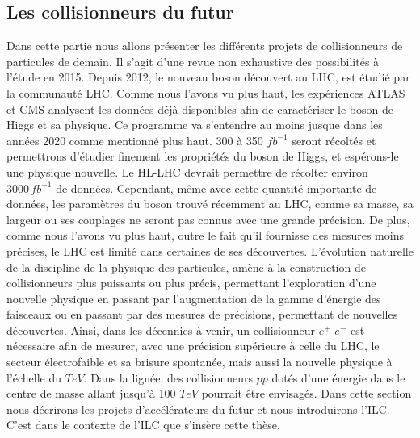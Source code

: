   
  \FloatBarrier
  
  \subsection{Les collisionneurs du futur}
  
  Dans cette partie nous allons pr\'esenter les diff\'erents projets de collisionneurs de particules de demain. Il s'agit d'une revue non exhaustive des possibilit\'es \`a l'\'etude en 2015. Depuis 2012, le nouveau boson d\'ecouvert au LHC, est \'etudi\'e par la communaut\'e LHC. Comme nous l'avons vu plus haut, les exp\'eriences ATLAS et CMS analysent les donn\'ees d\'ej\`a disponibles afin de caract\'eriser le boson de Higgs et sa physique. Ce programme va s'entendre au moins jusque dans les ann\'ees 2020 comme mentionn\'e plus haut. 300 \`a 350 $fb^{-1}$ seront r\'ecolt\'es et permettrons d'\'etudier finement les propri\'et\'es du boson de Higgs, et espérons-le une physique nouvelle. Le HL-LHC devrait permettre de r\'ecolter environ $3000 \, fb^{-1}$ de donn\'ees. Cependant, même avec cette quantit\'e importante de donn\'ees, les param\`etres du boson trouv\'e récemment au LHC, comme sa masse, sa largeur ou ses couplages ne seront pas connus avec une grande pr\'ecision. De plus, comme nous l'avons vu plus haut, outre le fait qu'il fournisse des mesures moins pr\'ecises, le LHC est limit\'e dans certaines de ses d\'ecouvertes. L'\'evolution naturelle de la discipline de la physique des particules, amène \`a la construction de collisionneurs plus puissants ou plus pr\'ecis, permettant l'exploration d'une nouvelle physique en passant par l'augmentation de la gamme d'\'energie des faisceaux ou en passant par des mesures de pr\'ecisions, permettant de nouvelles d\'ecouvertes. Ainsi, dans les d\'ecennies \`a venir, un collisionneur $e^+$ $e^-$ est n\'ecessaire afin de mesurer, avec une pr\'ecision sup\'erieure \`a celle du LHC, le secteur \'electrofaible et sa brisure spontan\'ee, mais aussi la nouvelle physique \`a l'\'echelle du $TeV$. Dans la lign\'ee, des collisionneurs $pp$ dot\'es d'une \'energie dans le centre de masse allant jusqu'\`a 100 $TeV$ pourrait \^etre envisag\'es. Dans cette section nous d\'ecrirons les projets d'acc\'el\'erateurs du futur et nous introduirons l'ILC. C'est dans le contexte de l'ILC que s'ins\`ere cette th\`ese.
  
